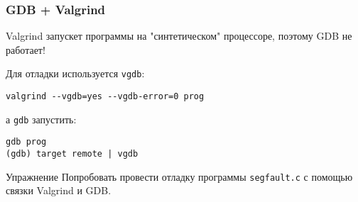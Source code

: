 \begin{frame}[fragile]
	\frametitle{GDB + Valgrind}

	Valgrind запускет программы на "синтетическом" процессоре, поэтому GDB не работает!

	Для отладки используется {\tt vgdb}: \\

	\begin{verbatim}
valgrind --vgdb=yes --vgdb-error=0 prog
	\end{verbatim}


	а {\tt gdb} запустить:
	\begin{verbatim}
gdb prog
(gdb) target remote | vgdb
	\end{verbatim}

	\pause
	\begin{block}{Упражнение}
		Попробовать провести отладку программы {\tt segfault.c} с помощью связки Valgrind и GDB.
	\end{block}
\end{frame}



